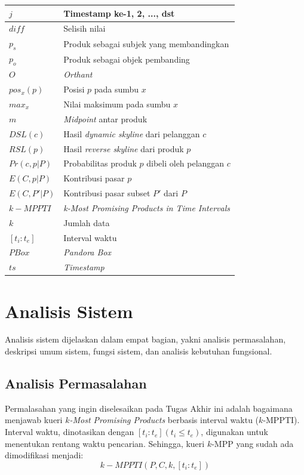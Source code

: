 \begin{longtable}{| p{3cm} | p{6cm} |}
	$j$ & Timestamp ke-1, 2, ..., dst\\ \hline
	$diff$ & Selisih nilai \\ \hline
	$p_s$ & Produk sebagai subjek yang membandingkan \\ \hline
	$p_o$ & Produk sebagai objek pembanding \\ \hline
	$O$ & \textit{Orthant}\\ \hline
	$pos_x(p)$ & Posisi $p$ pada sumbu $x$ \\ \hline
	$max_x$ & Nilai maksimum pada sumbu $x$ \\ \hline
	$m$ & \textit{Midpoint} antar produk\\ \hline
	$DSL(c)$ & Hasil \textit{dynamic skyline} dari pelanggan $c$\\ \hline
	$RSL(p)$ & Hasil \textit{reverse skyline} dari produk $p$\\ \hline
	$Pr(c, p|P)$ & Probabilitas produk $p$ dibeli oleh pelanggan $c$ \\ \hline
	$E(C, p|P)$ & Kontribusi pasar $p$\\ \hline
	$E(C, P'|P)$ & Kontribusi pasar subset $P'$ dari $P$ \\ \hline
	$k-MPPTI$ & \textit{k-Most Promising Products in Time Intervals} \\ \hline
	$k$ & Jumlah data \\ \hline
	$[t_i:t_e]$ & Interval waktu \\ \hline
	$PBox$ & \textit{Pandora Box} \\ \hline	
	$ts$ & \textit{Timestamp} \\ \hline	
	
\end{longtable}

\section{Analisis Sistem}
\tab Analisis sistem dijelaskan dalam empat bagian, yakni analisis permasalahan, deskripsi umum sistem, fungsi sistem, dan analisis kebutuhan fungsional.

\subsection{Analisis Permasalahan}
\tab Permalasahan yang ingin diselesaikan pada Tugas Akhir ini adalah bagaimana menjawab kueri \textit{$k$-Most Promising Products} berbasis interval waktu ($k$-MPPTI). Interval waktu, dinotasikan dengan $[t_i:t_e ](t_i \leq t_e)$, digunakan untuk menentukan rentang waktu pencarian. Sehingga, kueri $k$-MPP yang sudah ada \cite{kmpp} dimodifikasi menjadi:
\begin{equation}\label{eq:kmppts}
k-MPPTI(P, C, k, [t_i:t_e])
\end{equation} 

